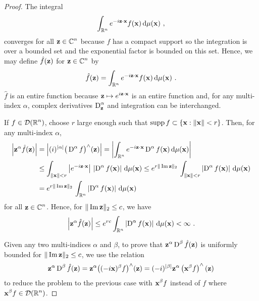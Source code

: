 \begin{proof}
The integral
\[
\int_{\mathbb{R}^n} e^{-i \mathbf{z}\cdot \mathbf{x}} f(\mathbf{x}) \,\mathrm{d}{\mu(\mathbf{x})} \ ,
\]
converges for all $\displaystyle \mathbf{z} \in \mathbb{C}^n$ because $f$ has a compact
support so the integration is over a bounded set and the
exponential factor is bounded on this set.
Hence, we may define $\hat{f}(\mathbf{z})$ for $\displaystyle \mathbf{z} \in \mathbb{C}^n$ by
\[
  \hat{f}(\VEC{z}) =
\int_{\RR^n} e^{-i \VEC{z}\cdot \VEC{x}} f(\VEC{x}) \dx{\mu(\VEC{x})} \ .
\]
$\hat{f}$ is an entire function because
$\displaystyle\mathbf{z} \mapsto  e^{i \mathbf{z}\cdot \mathbf{x}}$ is an entire function
and, for any multi-index $\alpha$, complex
derivatives $\displaystyle \operatorname{D}_{\mathbf{z}}^\alpha$ and integration
can be interchanged.

If $\displaystyle f \in \mathcal{D}(\mathbb{R}^n)$, choose $r$ large enough such that
$\operatorname{supp} f \subset \{ \mathbf{x} : \|\mathbf{x}\| < r \}$.  Then, for any
multi-index $\alpha$,
\begin{align}
\left| \mathbf{z}^\alpha \hat{f}(\mathbf{z}) \right|
&= \left| (i)^{|\alpha|} \big(\operatorname{D}^\alpha f\big)^\wedge(\mathbf{z}) \right|
= \left| \int_{\mathbb{R}^n} e^{-i \mathbf{z}\cdot\mathbf{x}} \operatorname{D}^\alpha f(\mathbf{x})
  \,\mathrm{d}{\mu(\mathbf{x})} \right| \nonumber \\
&\leq \int_{\|\mathbf{x}\| < r} \left| e^{-i \mathbf{z}\cdot\mathbf{x}}\right|\,
\left|\operatorname{D}^\alpha f(\mathbf{x})\right| \,\mathrm{d}{\mu(\mathbf{x})}
\leq e^{r \|\operatorname{Im} \mathbf{z}\|_2}\,\int_{\|\mathbf{x}\| < r}
\left|\operatorname{D}^\alpha f(\mathbf{x})\right| \,\mathrm{d}{\mu(\mathbf{x})} \nonumber \\
& = e^{r \|\operatorname{Im} \mathbf{z}\|_2}\,\int_{\mathbb{R}^n}
\left|\operatorname{D}^\alpha f(\mathbf{x})\right| \,\mathrm{d}{\mu(\mathbf{x})}
\label{proof_distr_four_f} 
\end{align}
for all $\displaystyle \mathbf{z} \in \mathbb{C}^n$.
Hence, for $\|\operatorname{Im} \mathbf{z} \|_2 \leq c$, we have
\[
\left| \mathbf{z}^\alpha \hat{f}(\mathbf{z}) \right|
\leq e^{r c}
\int_{\mathbb{R}^n} \left|\operatorname{D}^{\alpha} f(\mathbf{x})\right| \,\mathrm{d}{\mu(\mathbf{x})}
< \infty \ .
\]

Given any two multi-indices $\alpha$ and $\beta$, to prove that
$\displaystyle \mathbf{z}^\alpha \operatorname{D}^\beta \hat{f}(\mathbf{z})$ is
uniformly bounded for $\|\operatorname{Im} \mathbf{z} \|_2 \leq c$, we use the relation
\[
\mathbf{z}^\alpha \operatorname{D}^\beta \hat{f}(\mathbf{z}) =
\mathbf{z}^\alpha \big( (-i \mathbf{x})^\beta f\big)^{\wedge} (\mathbf{z})
= (-i)^{|\beta|} \mathbf{z}^\alpha
\left(\mathbf{x}^\beta f \right)^{\wedge}(\mathbf{z})
\]
to reduce the problem to the previous case with $\displaystyle \mathbf{x}^\beta f$
instead of $f$ where $\displaystyle \mathbf{x}^\beta f \in \mathcal{D}(\mathbb{R}^n)$.
\end{proof}

